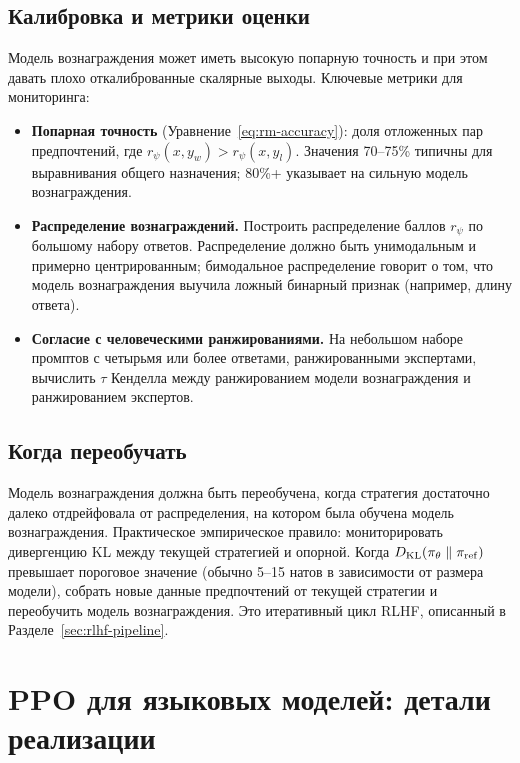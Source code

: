 \subsection{Калибровка и метрики оценки}
\label{sec:rm-eval}

Модель вознаграждения может иметь высокую попарную точность и при этом давать плохо откалиброванные скалярные выходы. Ключевые метрики для мониторинга:
\begin{itemize}[leftmargin=*]
  \item \textbf{Попарная точность} (Уравнение~\eqref{eq:rm-accuracy}): доля отложенных пар предпочтений, где $r_\psi(x, y_w) > r_\psi(x, y_l)$. Значения 70--75\% типичны для выравнивания общего назначения; 80\%+ указывает на сильную модель вознаграждения.
  \item \textbf{Распределение вознаграждений.} Построить распределение баллов $r_\psi$ по большому набору ответов. Распределение должно быть унимодальным и примерно центрированным; бимодальное распределение говорит о том, что модель вознаграждения выучила ложный бинарный признак (например, длину ответа).
  \item \textbf{Согласие с человеческими ранжированиями.} На небольшом наборе промптов с четырьмя или более ответами, ранжированными экспертами, вычислить $\tau$ Кенделла между ранжированием модели вознаграждения и ранжированием экспертов.
\end{itemize}

\subsection{Когда переобучать}

Модель вознаграждения должна быть переобучена, когда стратегия достаточно далеко отдрейфовала от распределения, на котором была обучена модель вознаграждения. Практическое эмпирическое правило: мониторировать дивергенцию KL между текущей стратегией и опорной. Когда $D_{\mathrm{KL}}\!\left(\pi_\theta\;\|\;\pi_{\mathrm{ref}}\right)$ превышает пороговое значение (обычно 5--15 натов в зависимости от размера модели), собрать новые данные предпочтений от текущей стратегии и переобучить модель вознаграждения. Это итеративный цикл RLHF, описанный в Разделе~\ref{sec:rlhf-pipeline}.

\section{PPO для языковых моделей: детали реализации}
\label{sec:ppo-lm}

